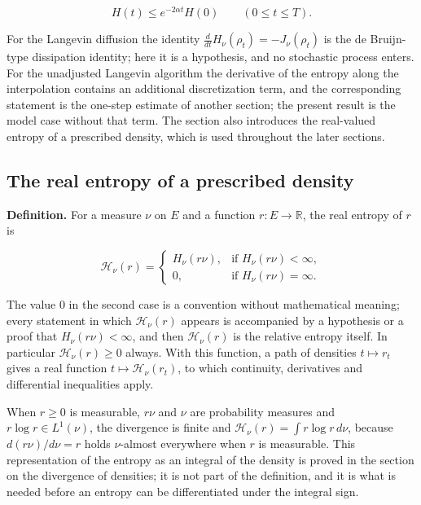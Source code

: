 \documentclass[11pt,a4paper]{report}
\begin{document}
\[H(t)\le e^{-2\alpha t}H(0)\qquad(0\le t\le T).\]


For the Langevin diffusion the identity \(\frac{d}{dt}H_\nu(\rho_t)=-J_\nu(\rho_t)\) is the de Bruijn-type dissipation identity; here it is a hypothesis, and no stochastic process enters. For the unadjusted Langevin algorithm the derivative of the entropy along the interpolation contains an additional discretization term, and the corresponding statement is the one-step estimate of another section; the present result is the model case without that term. The section also introduces the real-valued entropy of a prescribed density, which is used throughout the later sections.

\subsection{\texorpdfstring{The real entropy of a prescribed density}{The real entropy of a prescribed density}}
\label{report-step-UnadjustedLangevin-LSI-EntropyFlow-lean-1}


\textbf{Definition.} For a measure \(\nu\) on \(E\) and a function \(r:E\to\mathbb R\), the real entropy of \(r\) is


\[\mathcal H_\nu(r)=\begin{cases}H_\nu(r\nu), & \text{if }H_\nu(r\nu)<\infty,\\ 0, & \text{if }H_\nu(r\nu)=\infty.\end{cases}\]


The value \(0\) in the second case is a convention without mathematical meaning; every statement in which \(\mathcal H_\nu(r)\) appears is accompanied by a hypothesis or a proof that \(H_\nu(r\nu)<\infty\), and then \(\mathcal H_\nu(r)\) is the relative entropy itself. In particular \(\mathcal H_\nu(r)\ge0\) always. With this function, a path of densities \(t\mapsto r_t\) gives a real function \(t\mapsto\mathcal H_\nu(r_t)\), to which continuity, derivatives and differential inequalities apply.




When \(r\ge0\) is measurable, \(r\nu\) and \(\nu\) are probability measures and \(r\log r\in L^1(\nu)\), the divergence is finite and \(\mathcal H_\nu(r)=\int r\log r\,d\nu\), because \(d(r\nu)/d\nu=r\) holds \(\nu\)-almost everywhere when \(r\) is measurable. This representation of the entropy as an integral of the density is proved in the section on the divergence of densities; it is not part of the definition, and it is what is needed before an entropy can be differentiated under the integral sign.
\end{document}
